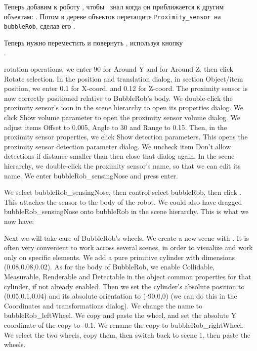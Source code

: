 \bigskip
Теперь добавим к роботу , 
чтобы \bubblerob\ знал когда он приближается к другим объектам:
.
Потом в дереве объектов перетащите \verb|Proximity_sensor|\ на
\verb|bubbleRob|, сделав его .

Теперь нужно переместить и повернуть ,
используя кнопку\\
.

rotation operations, we enter 90 for Around Y and for Around Z, then click
Rotate selection. In the position and translation dialog, in section 
Object/item position, we enter 0.1 for X-coord. and 0.12 for Z-coord. The 
proximity sensor is now correctly positioned relative to BubbleRob's body. 
We double-click the proximity sensor's icon in the scene hierarchy to open
its properties dialog. We click Show volume parameter to open the proximity
sensor volume dialog. We adjust items Offset to 0.005, Angle to 30 and Range
to 0.15. Then, in the proximity sensor properties, we click Show detection
parameters. This opens the proximity sensor detection parameter dialog. We
uncheck item Don't allow detections if distance smaller than then close that
dialog again. In the scene hierarchy, we double-click the proximity sensor's 
name, so that we can edit its name. We enter bubbleRob\_sensingNose 
and press enter.

We select bubbleRob\_sensingNose, then control-select bubbleRob, then click
. This attaches the sensor 
to the body of the robot. We could also have dragged bubbleRob\_sensingNose 
onto bubbleRob in the scene hierarchy. This is what we now have:


Next we will take care of BubbleRob's wheels. We create a new scene with
. It is often very convenient to work across 
several scenes, in order to visualize and work only on specific elements. 
We add a pure primitive cylinder with dimensions (0.08,0.08,0.02). As for 
the body of BubbleRob, we enable Collidable, Measurable, Renderable and 
Detectable in the object common properties for that cylinder, if not already
enabled. Then we set the cylinder's absolute position to (0.05,0.1,0.04) 
and its absolute orientation to (-90,0,0) (we can do this in the Coordinates
and transformations dialog). We change the name to bubbleRob\_leftWheel. We
copy and paste the wheel, and set the absolute Y coordinate of the copy to
-0.1. We rename the copy to bubbleRob\_rightWheel. We select the two wheels,
copy them, then switch back to scene 1, then paste the wheels.

